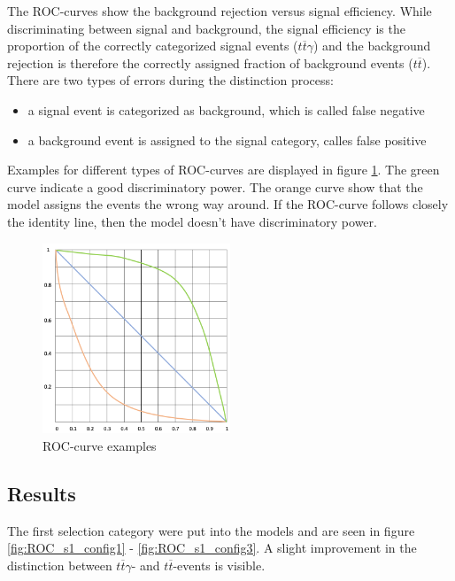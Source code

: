 \documentclass[11pt]{scrartcl}
\begin{document}
The ROC-curves show the background rejection versus signal efficiency. While discriminating between signal and background, the signal efficiency is the proportion of the correctly categorized signal events ($t\overline{t}\gamma$) and the background rejection is therefore the correctly assigned fraction of background events ($t\overline{t}$). There are two types of errors during the distinction process:
		\begin{itemize}
  			\item a signal event is categorized as background, which is called false negative
  			\item a background event is assigned to the signal category, calles false positive  			
  		\end{itemize}			
  		
Examples for different types of ROC-curves are displayed in figure \ref{fig:ROC_ex}. The green curve indicate a good discriminatory power. The orange curve show that the model assigns the events the wrong way around. If the ROC-curve follows closely the identity line, then the model doesn't have discriminatory power.

	\begin{figure}[H]
	\centering
	\includegraphics[width=0.5\textwidth]{figures/ROC_curve.png}
	\caption{ROC-curve examples}
	 \label{fig:ROC_ex}	
	\end{figure}
	
	\subsection{Results}
	
	The first selection category were put into the models and are seen in figure \ref{fig:ROC_s1_config1} - \ref{fig:ROC_s1_config3}. A slight improvement in the distinction between $t\overline{t}\gamma$- and $t\overline{t}$-events is visible. 
	
\end{document}
